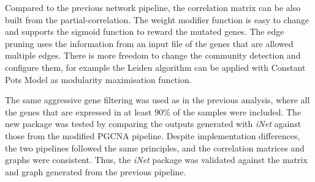 Compared to the previous network pipeline, the correlation matrix can be also built from the partial-correlation. The weight modifier function is easy to change and supports the sigmoid function to reward the mutated genes. The edge pruning uses the information from an input file of the genes that are allowed multiple edges. There is more freedom to change the community detection and configure them, for example the Leiden algorithm can be applied with Constant Pots Model as modularity maximisation function.


The same aggressive gene filtering was used as in the previous analysis, where all the genes that are expressed in at least 90\% of the samples were included. The new package was tested by comparing the outputs generated with \textit{iNet} against those from the modified PGCNA pipeline. Despite implementation differences, the two pipelines followed the same principles, and the correlation matrices and graphs were consistent. Thus, the \textit{iNet} package was validated against the matrix and graph generated from the previous pipeline.

